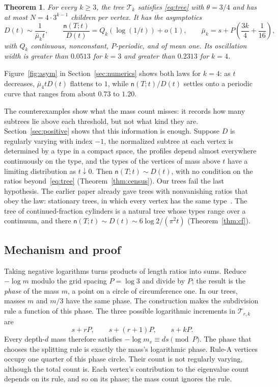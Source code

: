 \documentclass[11pt]{article}
\newtheorem{theorem}{Theorem}[section]
\theoremstyle{definition}
\theoremstyle{remark}
\newcommand{\cyl}{\mathcal T}
\newcommand{\ncount}{\mathsf n}
\begin{document}
\begin{theorem}\label{thm:concrete}
For every $k\ge3$, the tree $\cyl_k$ satisfies \eqref{eq:tree} with
$\theta=3/4$ and has at most $N=4\cdot3^{k-1}$ children per vertex. It has
the asymptotics
\[
 D(t)\sim\frac1{\bar\mu_k t},\qquad
 \frac{\ncount(T;t)}{D(t)}=Q_k(\log(1/t))+o(1),\qquad
 \bar\mu_k=s+P\left(\frac{3k}4+\frac1{16}\right),
\]
with $Q_k$ continuous, nonconstant, $P$-periodic, and of mean one.
Its oscillation width is greater than $0.0513$ for $k=3$ and greater
than $0.2313$ for $k=4$.
\end{theorem}

Figure~\ref{fig:asym} in Section~\ref{sec:numerics} shows both laws for
$k=4$: as $t$ decreases, $\bar\mu_4tD(t)$ flattens to $1$, while
$\ncount(T;t)/D(t)$ settles onto a periodic curve that ranges from about
$0.73$ to $1.20$.

The counterexamples show what the mass count misses: it records how many
subtrees lie above each threshold, but not what kind they are.
Section~\ref{sec:positive} shows that this information is enough.
Suppose $D$ is regularly varying with index $-1$, the normalized subtree
at each vertex is determined by a type in a compact space, the profiles
depend almost everywhere continuously on the type, and the types of the
vertices of mass above $t$ have a limiting distribution as
$t\downarrow0$. Then $\ncount(T;t)\sim D(t)$, with no condition on the
ratios beyond~\eqref{eq:tree} (Theorem~\ref{thm:census}). Our trees fail
the last hypothesis. The earlier paper already gave trees with
nonvanishing ratios that obey the law: stationary trees, in which every
vertex has the same type~\cite[Prop.~B.1]{K26}. The tree of
continued-fraction cylinders is a natural tree whose types range over a
continuum, and there $\ncount(T;t)\sim D(t)\sim6\log2/(\pi^2t)$
(Theorem~\ref{thm:cf}).

\subsection{Mechanism and proof}
Taking negative logarithms turns products of length ratios into sums.
Reduce $-\log m$ modulo the grid spacing $P=\log3$ and divide by $P$;
the result is the \emph{phase} of the mass $m$, a point on a circle of
circumference one. In our trees, masses $m$ and $m/3$ have the same
phase. The construction makes the
subdivision rule a function of this phase. The three possible
logarithmic increments in $\cyl_{r,k}$ are
\[
 s+rP,\qquad s+(r+1)P,\qquad s+kP.
\]
Every depth-$d$ mass therefore satisfies $-\log m_v\equiv ds\pmod P$.
The phase that chooses the splitting rule is exactly the mass's
logarithmic phase. Rule-A vertices occupy one quarter of this phase
circle. Their count is not regularly varying, although the total count
is. Each vertex's contribution to the eigenvalue count depends on its
rule, and so on its phase; the mass count ignores the rule.
\end{document}
